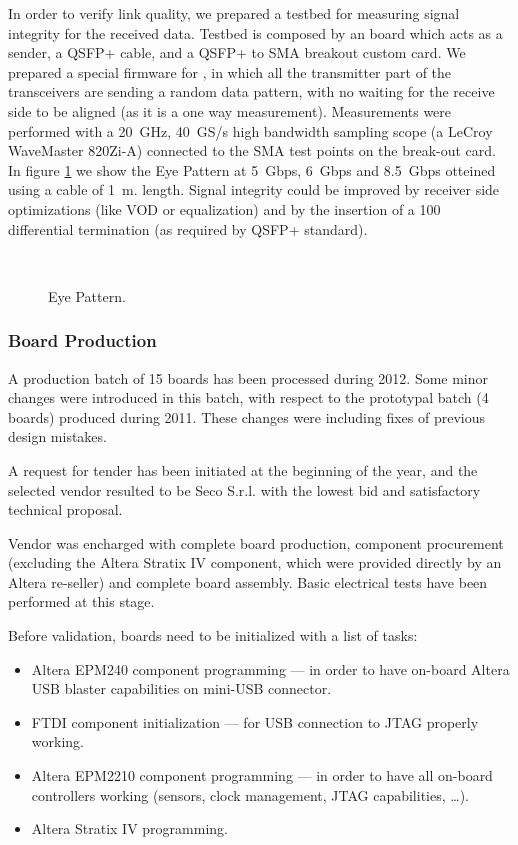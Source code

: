 In order to verify link quality, we prepared a testbed for measuring
signal integrity for the received data. Testbed is composed by an
\apenetp board which acts as a sender, a QSFP+ cable, and a QSFP+ to
SMA breakout custom card.
We prepared a special firmware for \apenetp, in which all the
transmitter part of the transceivers are sending a random data
pattern, with no waiting for the receive side to be aligned (as it is
a one way measurement). Measurements were performed with a 20~GHz,
40~GS/s high bandwidth sampling scope (a LeCroy WaveMaster 820Zi-A)
connected to the SMA test points on the break-out card.
In figure \ref{fig:subfig} we show the Eye Pattern at 5~Gbps, 6~Gbps
and 8.5~Gbps otteined using a cable of 1~m. length.
Signal integrity could be improved by receiver side optimizations
(like VOD or equalization) and by the insertion of a 100~
differential termination (as required by QSFP+ standard).

\begin{figure}
\centering
{} \quad
{} \\
 \quad
\caption{Eye Pattern.}
\label{fig:subfig}
\end{figure}



\subsubsection{Board Production} A production batch of 15 boards has been processed during 2012.  Some
minor changes were introduced in this batch, with respect to the
prototypal batch (4 boards) produced during 2011. These changes were
including fixes of previous design mistakes.

A request for tender has been initiated at the beginning of the year,
and the selected vendor resulted to be Seco S.r.l. with the lowest bid
and satisfactory technical proposal.

Vendor was encharged with complete board production, component
procurement (excluding the Altera Stratix IV component, which were
provided directly by an Altera re-seller) and complete board
assembly. Basic electrical tests have been performed at this stage.

Before validation, boards need to be initialized with a list of tasks:
\begin{itemize}
 \item Altera EPM240 component programming --- in order to have
 on-board Altera USB blaster capabilities on mini-USB connector.
 \item FTDI component initialization --- for USB connection to JTAG
 properly working.
 \item Altera EPM2210 component programming --- in order to have all
 on-board controllers working (sensors, clock management, JTAG
 capabilities, \dots).
 \item Altera Stratix IV programming.
\end{itemize}

